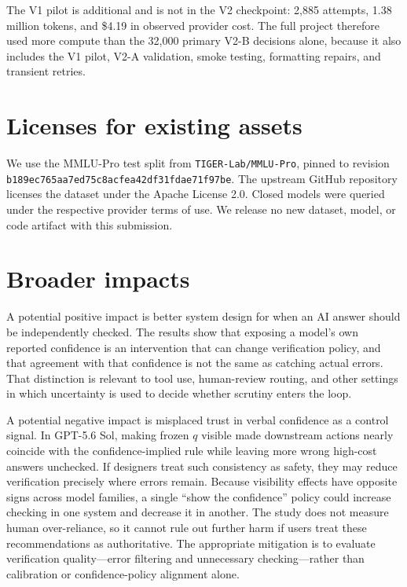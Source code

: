 The V1 pilot is additional and is not in the V2 checkpoint: 2,885 attempts,
1.38 million tokens, and \$4.19 in observed provider cost. The full project
therefore used more compute than the 32,000 primary V2-B decisions alone,
because it also includes the V1 pilot, V2-A validation, smoke testing,
formatting repairs, and transient retries.

\section{Licenses for existing assets}
\label{app:licenses}

We use the MMLU-Pro test split \citep{wang2024mmlupro} from
\texttt{TIGER-Lab/MMLU-Pro}, pinned to revision
\texttt{b189ec765aa7ed75c8acfea42df31fdae71f97be}. The upstream GitHub
repository licenses the dataset under the Apache License 2.0. Closed models
were queried under the respective provider terms of use. We release no new
dataset, model, or code artifact with this submission.

\section{Broader impacts}
\label{app:impacts}

A potential positive impact is better system design for when an AI answer
should be independently checked. The results show that exposing a model's
own reported confidence is an intervention that can change verification
policy, and that agreement with that confidence is not the same as catching
actual errors. That distinction is relevant to tool use, human-review
routing, and other settings in which uncertainty is used to decide whether
scrutiny enters the loop.

A potential negative impact is misplaced trust in verbal confidence as a
control signal. In GPT-5.6 Sol, making frozen $q$ visible made downstream
actions nearly coincide with the confidence-implied rule while leaving more
wrong high-cost answers unchecked. If designers treat such consistency as
safety, they may reduce verification precisely where errors remain. Because
visibility effects have opposite signs across model families, a single
``show the confidence'' policy could increase checking in one system and
decrease it in another. The study does not measure human over-reliance, so
it cannot rule out further harm if users treat these recommendations as
authoritative. The appropriate mitigation is to evaluate verification
quality---error filtering and unnecessary checking---rather than calibration
or confidence-policy alignment alone.
